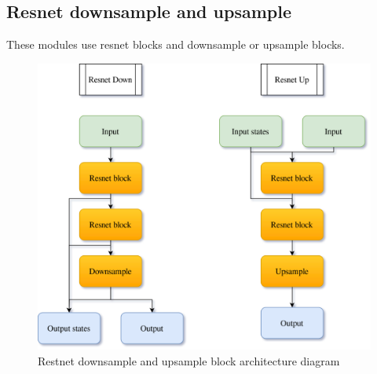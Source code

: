 \documentclass[11pt,a4paper]{report}
\begin{document}
\subsection{Resnet downsample and upsample}
These modules use resnet blocks and downsample or upsample blocks.
\begin{figure}[H]
	\centering
	\includegraphics[scale=0.2]{images/ResnetDownUp.drawio}
    \caption{Restnet downsample and upsample block architecture diagram}
\end{figure}
\end{document}
